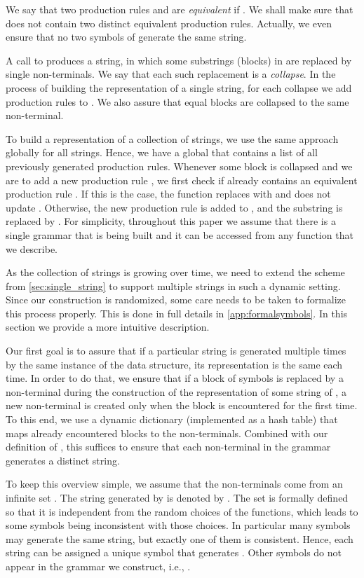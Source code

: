 \documentclass[a4paper]{article}
\newenvironment{shortv}{}{}
\theoremstyle{remark}
\begin{document}
\begin{shortv}
We say that two production rules  and  are \emph{equivalent} if .
We shall make sure that  does not contain two distinct equivalent production rules.
Actually, we even ensure that no two symbols of  generate the same string.

A call to  produces a string, in which some substrings (blocks) in  are replaced by single non-terminals.
We say that each such replacement is a \emph{collapse}.
In the process of building the representation of a single string, for each collapse we add production rules to .
We also assure that equal blocks are collapsed to the same non-terminal.

To build a representation of a collection of strings, we use the same approach globally for all strings.
Hence, we have a global  that contains a list of all previously generated production rules.
Whenever some block is collapsed and we are to add a new production rule , we first check if  already contains an equivalent production rule .
If this is the case, the function replaces  with  and does not update .
Otherwise, the new production rule  is added to , and the substring  is replaced by .
For simplicity, throughout this paper we assume that there is a single grammar  that is being built and it can be accessed from any function that we describe.
\end{shortv}

As the collection of strings  is growing over time, we need to extend the scheme from \cref{sec:single_string} to support multiple strings in such a dynamic setting.
Since our construction is randomized, some care needs to be taken to formalize this process properly.
This is done in full details in \cref{app:formalsymbols}.
In this section we provide a more intuitive description.

Our first goal is to assure that if a particular string is generated multiple times by the same instance of the data structure,
its representation is the same each time.
In order to do that, 
we ensure that if a block of symbols  is replaced by a non-terminal during the construction of the representation of some string of , 
a new non-terminal is created only when the block  is encountered for the first time.
To this end, we use a dynamic dictionary (implemented as a hash table) that maps already encountered blocks to the non-terminals.
Combined with our definition of , this suffices to ensure that each non-terminal in the grammar generates a distinct string.

To keep this overview simple, we assume that the non-terminals come from an infinite set .
The string generated by  is denoted by .
The set  is formally defined so that it is independent from the random choices of the  functions,
which leads to some symbols being inconsistent with those choices. 
In particular many symbols may generate the same string, but exactly one of them is consistent. 
Hence, each string  can be assigned a unique symbol  that generates .
Other symbols do not appear in the grammar we construct, i.e., .
\end{document}
